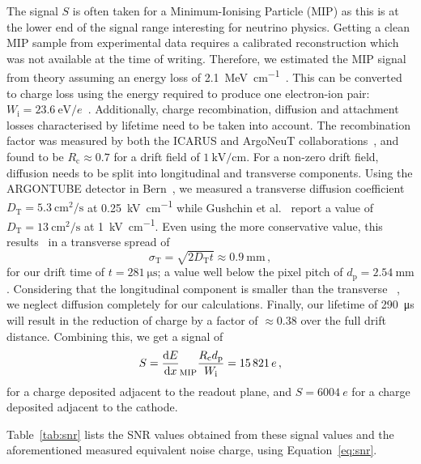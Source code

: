 \documentclass[a4paper]{article}
\newcommand*{\m}{\mathrm}
\begin{document}
The signal $S$ is often taken for a Minimum-Ionising Particle (MIP) as this is at the lower end of the signal range interesting for neutrino physics.
Getting a clean MIP sample from experimental data requires a calibrated reconstruction which was not available at the time of writing.
Therefore, we estimated the MIP signal from theory assuming an energy loss of \SI{2.1}{\mega\electronvolt\per\centi\metre}~\cite{pdg}.
This can be converted to charge loss using the energy required to produce one electron-ion pair: $W_{\m{i}} = \SI{23.6}{\electronvolt\per\elementarycharge}$~\cite{NobleGasDetectors}.
Additionally, charge recombination, diffusion and attachment losses characterised by lifetime need to be taken into account.
The recombination factor was measured by both the ICARUS and ArgoNeuT collaborations~\cite{icarusReco, argoneutReco}, and found to be $R_{\m{c}} \approx 0.7$ for a drift field of $\SI{1}{\kilo\volt\per\centi\meter}$.
For a non-zero drift field, diffusion needs to be split into longitudinal and transverse components.
Using the ARGONTUBE detector in Bern~\cite{argontube}, we measured a transverse diffusion coefficient $D_{\m{T}} = \SI{5.3}{\centi\metre\squared\per\second}$ at \SI{0.25}{\kilo\volt\per\centi\metre} while Gushchin et al.~\cite{gushchin} report a value of $D_{\m{T}} = \SI{13}{\centi\metre\squared\per\second}$ at \SI{1}{\kilo\volt\per\centi\metre}.
Even using the more conservative value, this results~\cite{lngDet} in a transverse spread of
\begin{equation}
\sigma_{\m{T}} = \sqrt{2 D_{\m{T}} t} \approx \SI{0.9}{\milli\metre}\,, 
\end{equation}
for our drift time of $t = \SI{281}{\micro\second}$; a value well below the pixel pitch of $d_{\m{p}} = \SI{2.54}{\milli\metre}$.
Considering that the longitudinal component is smaller than the transverse ~\cite{lngDet}, we neglect diffusion completely for our calculations.
Finally, our lifetime of \SI{290}{\micro\second} will result in the reduction of charge by a factor of $\approx\num{0.38}$ over the full drift distance.
Combining this, we get a signal of 
\begin{equation}
S = \dv{E}{x}_{\m{MIP}} \frac{R_{\m{c}} d_{\m{p}}}{W_{\m{i}}} = \SI{15821}{\elementarycharge}\,,
\end{equation}
for a charge deposited adjacent to the readout plane, and $S = \SI{6004}{\elementarycharge}$ for a charge deposited adjacent to the cathode.

Table~\ref{tab:snr} lists the SNR values obtained from these signal values and the aforementioned measured equivalent noise charge, using Equation~\eqref{eq:snr}.
\end{document}
